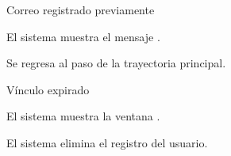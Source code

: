 {\begin{trayectoriaAlternativa}
  \end{trayectoriaAlternativa}


  \begin{trayectoriaAlternativa}
    {Correo registrado previamente}

    \item El sistema muestra el mensaje
      .

    \item Se regresa al paso  de la trayectoria
      principal.

  \end{trayectoriaAlternativa}


  \begin{trayectoriaAlternativa}
    {Vínculo expirado}

    \item El sistema muestra la ventana
      .

    \item El sistema elimina el registro del usuario.

  \end{trayectoriaAlternativa}

}
